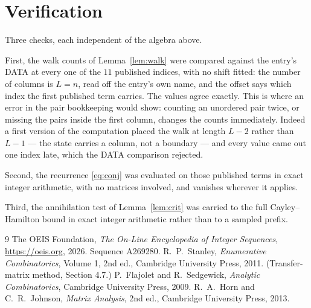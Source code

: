 \documentclass[11pt,a4paper]{article}
\theoremstyle{plain}
\theoremstyle{definition}
\begin{document}
\section{Verification}

Three checks, each independent of the algebra above.

First, the walk counts of Lemma~\ref{lem:walk} were compared against the entry's DATA at
every one of the $11$ published indices, with no shift fitted: the number of columns is
$L=n$, read off the entry's own name, and the offset says which index the first
published term carries. The values agree exactly. This is where an error in the pair
bookkeeping would show: counting an unordered pair twice, or missing the pairs inside the
first column, changes the counts immediately. Indeed a first version of the computation
placed the walk at length $L-2$ rather than $L-1$ --- the state carries a column, not a
boundary --- and every value came out one index late, which the DATA comparison rejected.

Second, the recurrence \eqref{eq:conj} was evaluated on those published terms in exact
integer arithmetic, with no matrices involved, and vanishes wherever it applies.

Third, the annihilation test of Lemma~\ref{lem:crit} was carried to the full
Cayley--Hamilton bound in exact integer arithmetic rather than to a sampled prefix.

\begin{thebibliography}{9}
 The OEIS Foundation, \emph{The On-Line Encyclopedia of Integer
Sequences}, \url{https://oeis.org}, 2026. Sequence A269280.
 R.~P.~Stanley, \emph{Enumerative Combinatorics}, Volume 1, 2nd ed.,
Cambridge University Press, 2011. (Transfer-matrix method, Section 4.7.)
 P.~Flajolet and R.~Sedgewick, \emph{Analytic Combinatorics}, Cambridge
University Press, 2009.
 R.~A.~Horn and C.~R.~Johnson, \emph{Matrix Analysis}, 2nd ed., Cambridge
University Press, 2013.
\end{thebibliography}
\end{document}
